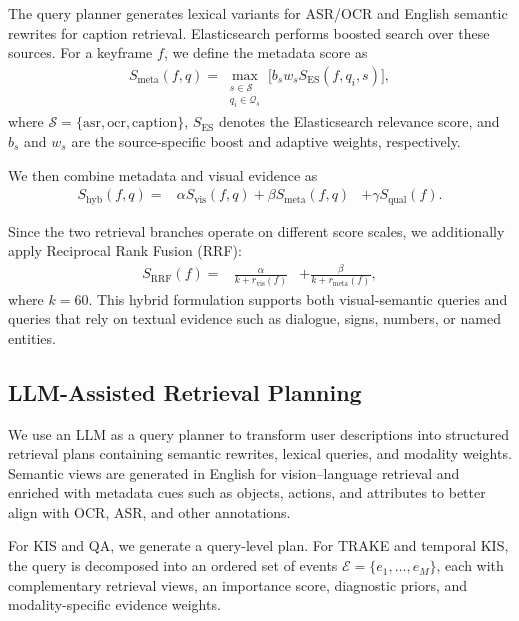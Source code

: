 \documentclass[runningheads]{llncs}
\begin{document}
The query planner generates lexical variants for ASR/OCR and English
semantic rewrites for caption retrieval. Elasticsearch performs boosted search over these sources. For a keyframe $f$, we
define the metadata score as
\begin{equation}
\begin{aligned}
S_{\mathrm{meta}}(f,q)
=
\max_{\substack{
s \in \mathcal{S} \\
q_i \in \mathcal{Q}_s
}}
\bigl[
b_s w_s S_{\mathrm{ES}}(f,q_i,s)
\bigr],
\end{aligned}
\end{equation}
where
$\mathcal{S}=\{\mathrm{asr},\mathrm{ocr},\mathrm{caption}\}$,
$S_{\mathrm{ES}}$ denotes the Elasticsearch relevance score, and
$b_s$ and $w_s$ are the source-specific boost and adaptive weights,
respectively.

We then combine metadata and visual evidence as
\begin{equation}
\begin{aligned}
S_{\mathrm{hyb}}(f,q)
={}&
\alpha S_{\mathrm{vis}}(f,q)
+
\beta S_{\mathrm{meta}}(f,q)
&+
\gamma S_{\mathrm{qual}}(f).
\end{aligned}
\end{equation}

Since the two retrieval branches operate on different score scales,
we additionally apply Reciprocal Rank Fusion (RRF):
\begin{equation}
\begin{aligned}
S_{\mathrm{RRF}}(f)
={}&
\frac{\alpha}{k+r_{\mathrm{vis}}(f)}
&+
\frac{\beta}{k+r_{\mathrm{meta}}(f)},
\end{aligned}
\end{equation}
where $k=60$. This hybrid formulation supports both visual-semantic
queries and queries that rely on textual evidence such as dialogue,
signs, numbers, or named entities.


\subsection{LLM-Assisted Retrieval Planning}
We use an LLM as a query planner to transform user descriptions into structured retrieval plans containing semantic rewrites, lexical queries, and modality weights. Semantic views are generated in English for vision--language retrieval and enriched with metadata cues such as objects, actions, and attributes to better align with OCR, ASR, and other annotations.

For KIS and QA, we generate a query-level plan. For TRAKE and temporal KIS, the query is decomposed into an ordered set of events $\mathcal{E}=\{e_1,\ldots,e_M\}$, each with complementary retrieval views, an importance score, diagnostic priors, and modality-specific evidence weights.
\end{document}
